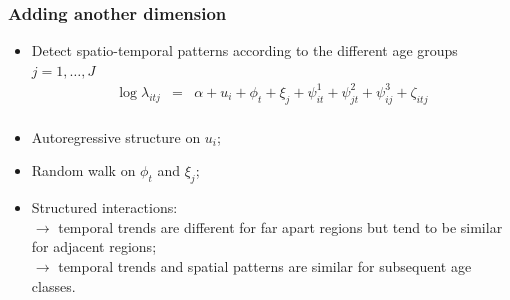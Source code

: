 \documentclass[slidestop,compress,serif,10pt]{beamer}
\begin{document}
\begin{frame}\frametitle{Adding another dimension}
\begin{itemize}
\vfill\item Detect spatio-temporal patterns according to the different age groups $j=1,\ldots,J$
\vfill\begin{eqnarray*}
\log \lambda_{itj} & = & \alpha + u_i + \phi_t + \xi_j + \psi^1_{it} + \psi^2_{jt} + \psi^3_{ij} + \zeta_{itj}\\
\end{eqnarray*}
\vfill\item Autoregressive structure on $u_i$;
\vfill\item Random walk on $\phi_t$ and $\xi_j$;
\vfill\item Structured interactions:\\ 
$\rightarrow$ temporal trends are different for far apart regions but tend to be similar for adjacent regions;\\
$\rightarrow$ temporal trends and spatial patterns are similar for subsequent age classes.

\end{itemize}

\fontsize{7}{7}

\end{frame}
\end{document}
